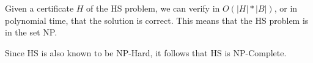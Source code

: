 \documentclass[paper=a4, fontsize=11pt]{scrartcl} %
\numberwithin{equation}{section} %
\numberwithin{figure}{section} %
\numberwithin{table}{section} %
\begin{document}
\begin{enumerate}
Given a certificate $H$ of the HS problem, we can verify in $O(\left | H \right | * \left | B \right |)$, or in polynomial time, that the solution is correct. This means that the HS problem is in the set NP.

Since HS is also known to be NP-Hard, it follows that HS is NP-Complete.
\end{enumerate}

\end{document}
